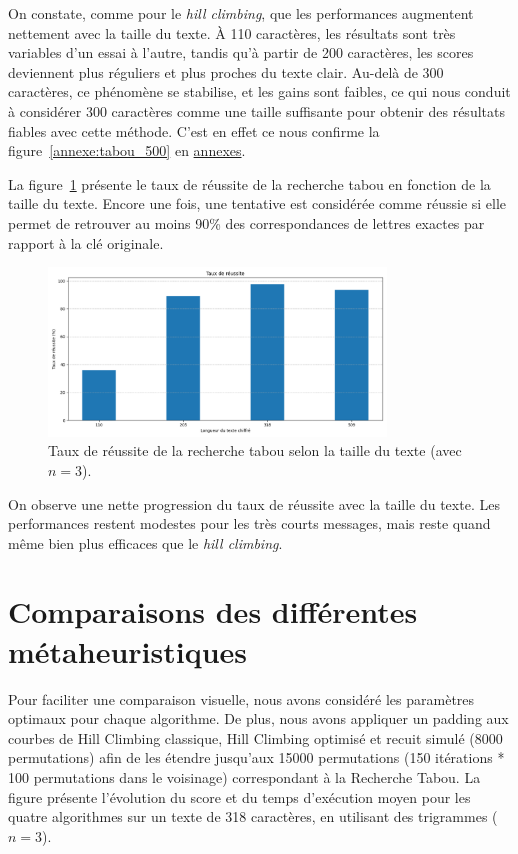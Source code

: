 \documentclass[a4paper]{article}
\begin{document}
On constate, comme pour le \textit{hill climbing}, que les performances augmentent nettement avec la taille du texte. À 110 caractères, les résultats sont très variables d’un essai à l’autre, tandis qu’à partir de 200 caractères, les scores deviennent plus réguliers et plus proches du texte clair. Au-delà de 300 caractères, ce phénomène se stabilise, et les gains sont faibles, ce qui nous conduit à considérer 300 caractères comme une taille suffisante pour obtenir des résultats fiables avec cette méthode. C'est en effet ce nous confirme la figure~\ref{annexe:tabou_500} en \hyperref[sec:annexes]{annexes}.

\medskip

La figure~\ref{fig:tabou_taux} présente le taux de réussite de la recherche tabou en fonction de la taille du texte. Encore une fois, une tentative est considérée comme réussie si elle permet de retrouver au moins 90\% des correspondances de lettres exactes par rapport à la clé originale.

\begin{figure}[H]
    \centering
    \includegraphics[width=0.8\textwidth]{taux_reussite_tabou.png}
    \caption{Taux de réussite de la recherche tabou selon la taille du texte (avec $n = 3$).}
    \label{fig:tabou_taux}
\end{figure}

On observe une nette progression du taux de réussite avec la taille du texte. Les performances restent modestes pour les très courts messages, mais reste quand même bien plus efficaces que le \textit{hill climbing}.

\section{Comparaisons des différentes métaheuristiques}
\label{sec:comparaison_meta}
Pour faciliter une comparaison visuelle, nous avons considéré les paramètres optimaux pour chaque algorithme. De plus, nous avons appliquer un padding 
aux courbes de Hill Climbing classique, Hill Climbing optimisé et recuit simulé (8000 permutations) afin de les étendre jusqu'aux 15000 permutations 
(150 itérations * 100 permutations dans le voisinage) correspondant à la Recherche Tabou. La figure présente l'évolution du score et du temps d'exécution 
moyen pour les quatre algorithmes sur un texte de 318 caractères, en utilisant des trigrammes ($n=3$).
\end{document}

